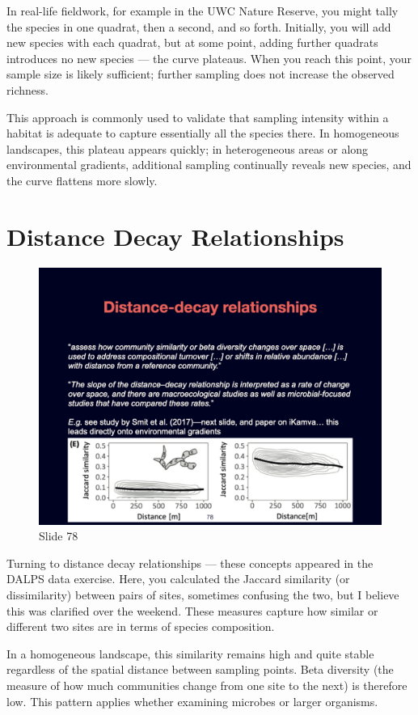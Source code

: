 \documentclass[
  12pt,
]{book}
\begin{document}
In real-life fieldwork, for example in the UWC Nature Reserve, you might
tally the species in one quadrat, then a second, and so forth.
Initially, you will add new species with each quadrat, but at some
point, adding further quadrats introduces no new species --- the curve
plateaus. When you reach this point, your sample size is likely
sufficient; further sampling does not increase the observed richness.

This approach is commonly used to validate that sampling intensity
within a habitat is adequate to capture essentially all the species
there. In homogeneous landscapes, this plateau appears quickly; in
heterogeneous areas or along environmental gradients, additional
sampling continually reveals new species, and the curve flattens more
slowly.

\section{Distance Decay
Relationships}\label{distance-decay-relationships}

\begin{figure}[ht]
\centering
\includegraphics[width=0.8\linewidth]{../images/BDC334/BDC334-078.jpeg}
\caption*{Slide 78}
\end{figure}

Turning to distance decay relationships --- these concepts appeared in
the DALPS data exercise. Here, you calculated the Jaccard similarity (or
dissimilarity) between pairs of sites, sometimes confusing the two, but
I believe this was clarified over the weekend. These measures capture
how similar or different two sites are in terms of species composition.

In a homogeneous landscape, this similarity remains high and quite
stable regardless of the spatial distance between sampling points. Beta
diversity (the measure of how much communities change from one site to
the next) is therefore low. This pattern applies whether examining
microbes or larger organisms.
\end{document}
